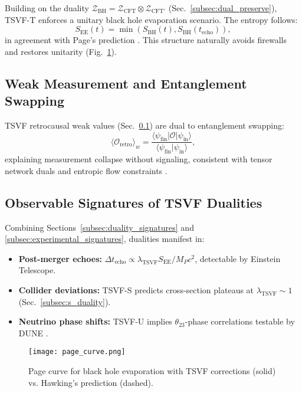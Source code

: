 \documentclass[twocolumn,superscriptaddress,floatfix]{revtex4-2}
\begin{document}
Building on the duality $\mathcal{Z}_{\text{BH}} = \mathcal{Z}_{\text{CFT}} \otimes \mathcal{Z}_{\text{CFT}'}$ (Sec.~\ref{subsec:dual_preserve}), TSVF-T enforces a unitary black hole evaporation scenario. The entropy follows:
\begin{equation}
S_{\text{EE}}(t) = \min\left(S_{\text{BH}}(t), S_{\text{BH}}(t_{\text{echo}})\right),
\end{equation}
in agreement with Page's prediction \cite{Page:1993}. This structure naturally avoids firewalls and restores unitarity (Fig.~\ref{fig:page}).

\subsection{Weak Measurement and Entanglement Swapping}
\label{subsec:weak_swapping}

TSVF retrocausal weak values (Sec.~\ref{subsec:weak_swapping}) are dual to entanglement swapping:
\begin{equation}
\langle \mathcal{O}_{\text{retro}} \rangle_w = \frac{\langle \psi_{\text{fin}}|\mathcal{O}|\psi_{\text{in}}\rangle}{\langle \psi_{\text{fin}}|\psi_{\text{in}}\rangle},
\end{equation}
explaining measurement collapse without signaling, consistent with tensor network duals and entropic flow constraints \cite{Aharonov:2008}.

\subsection{Observable Signatures of TSVF Dualities}
\label{subsec:tsvf_signatures}

Combining Sections~\ref{subsec:duality_signatures} and \ref{subsec:experimental_signatures}, dualities manifest in:
\begin{itemize}
\item \textbf{Post-merger echoes:} $\Delta t_{\text{echo}} \propto \lambda_{\text{TSVF}} S_{\text{EE}} / M_P c^2$, detectable by Einstein Telescope.
\item \textbf{Collider deviations:} TSVF-S predicts cross-section plateaus at $\lambda_{\text{TSVF}} \sim 1$ (Sec.~\ref{subsec:s_duality}).
\item \textbf{Neutrino phase shifts:} TSVF-U implies $\theta_{23}$-phase correlations testable by DUNE \cite{Abi2021}.
\end{itemize}

\begin{figure}[t]
\centering
\texttt{[image: page\_curve.png]}
\caption{Page curve for black hole evaporation with TSVF corrections (solid) vs. Hawking’s prediction (dashed).}
\label{fig:page}
\end{figure}
\end{document}
